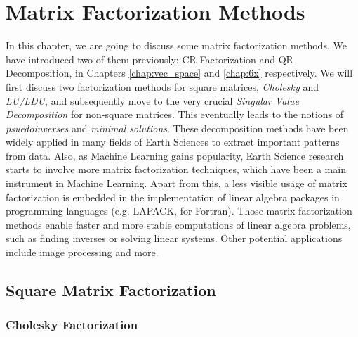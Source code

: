 \chapter{Matrix Factorization Methods}

In this chapter, we are going to discuss some matrix factorization methods. We have introduced two of them previously: CR Factorization and QR Decomposition, in Chapters \ref{chap:vec_space} and \ref{chap:6x} respectively. We will first discuss two factorization methods for square matrices, \textit{Cholesky} and \textit{LU/LDU}, and subsequently move to the very crucial \textit{Singular Value Decomposition} for non-square matrices. This eventually leads to the notions of \textit{psuedoinverses} and \textit{minimal solutions}. These decomposition methods have been widely applied in many fields of Earth Sciences to extract important patterns from data. Also, as Machine Learning gains popularity, Earth Science research starts to involve more matrix factorization techniques, which have been a main instrument in Machine Learning. Apart from this, a less visible usage of matrix factorization is embedded in the implementation of linear algebra packages in programming languages (e.g. LAPACK, for Fortran). Those matrix factorization methods enable faster and more stable computations of linear algebra problems, such as finding inverses or solving linear systems. Other potential applications include image processing and more.

\section{Square Matrix Factorization}
\subsection{Cholesky Factorization}

